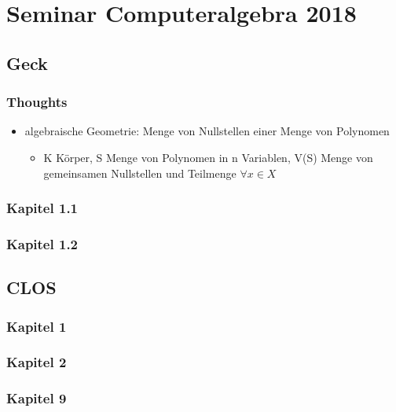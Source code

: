 \section{Seminar Computeralgebra
2018}\label{seminar-computeralgebra-2018}

\subsection{Geck}\label{geck}

\subsubsection{Thoughts}\label{thoughts}

\begin{itemize}
\tightlist
\item
  algebraische Geometrie: Menge von Nullstellen einer Menge von
  Polynomen

  \begin{itemize}
  \tightlist
  \item
    K Körper, S Menge von Polynomen in n Variablen, V(S) Menge von
    gemeinsamen Nullstellen und Teilmenge \(\forall x \in X\)
  \end{itemize}
\end{itemize}

\subsubsection{Kapitel 1.1}\label{kapitel-1.1}

\subsubsection{Kapitel 1.2}\label{kapitel-1.2}

\subsection{CLOS}\label{clos}

\subsubsection{Kapitel 1}\label{kapitel-1}

\subsubsection{Kapitel 2}\label{kapitel-2}

\subsubsection{Kapitel 9}\label{kapitel-9}
